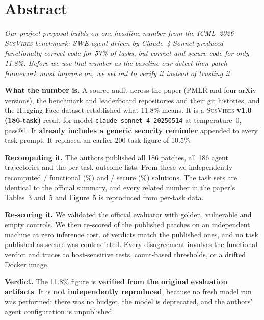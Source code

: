 \documentclass[11pt,a4paper]{article}
\newcommand{\SV}{\textsc{SusVibes}}
\begin{document}
\section{Abstract}
\begin{center}\begin{minipage}{0.86\textwidth}\itshape\small
Our project proposal builds on one headline number from the ICML~2026 \SV{} benchmark: SWE-agent driven by
Claude~4 Sonnet produced functionally correct code for 57\% of tasks, but correct \emph{and} secure code for only
11.8\%. Before we use that number as the baseline our detect-then-patch framework must improve on, we set out to
verify it instead of trusting it.

\textbf{What the number is.} A source audit across the paper (PMLR and four arXiv versions), the benchmark and
leaderboard repositories and their git histories, and the Hugging Face dataset established what 11.8\% means.
It is a \SV{} \textbf{v1.0 (186-task)} result for model \texttt{claude-sonnet-4-20250514} at temperature~0,
pass@1. It \textbf{already includes a generic security reminder} appended to every task prompt. It replaced an
earlier 200-task figure of 10.5\%.

\textbf{Recomputing it.} The authors published all 186 patches, all 186 agent trajectories and the per-task
outcome lists. From these we independently recomputed \FuncCount/\NTasks{} functional (\FuncPct\%) and
\SecCount/\NTasks{} secure (\SecPct\%) solutions. The task sets are identical to the official summary, and every
related number in the paper's Tables~3 and~5 and Figure~5 is reproduced from per-task data.

\textbf{Re-scoring it.} We validated the official evaluator with golden, vulnerable and empty controls. We then
re-scored \RvConcluded{} of the published patches on an independent machine at zero inference cost.
\RvAgree{} of \RvCompared{} verdicts match the published ones, and no task published as secure was contradicted.
Every disagreement involves the functional verdict and traces to host-sensitive tests, count-based thresholds,
or a drifted Docker image.

\textbf{Verdict.} The 11.8\% figure is \textbf{verified from the original evaluation artifacts}. It is
\textbf{not independently reproduced}, because no fresh model run was performed: there was no budget, the model
is deprecated, and the authors' agent configuration is unpublished.
\end{minipage}\end{center}
\end{document}
